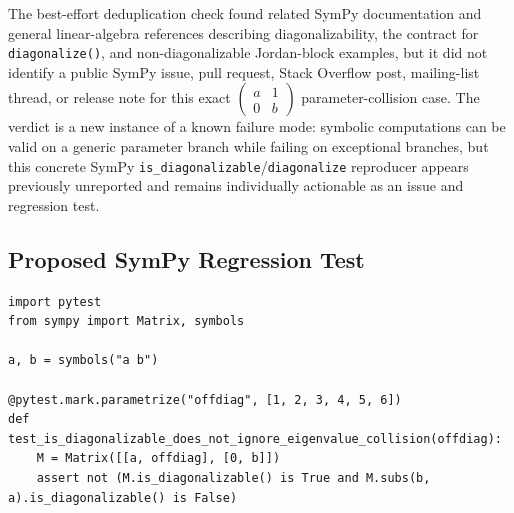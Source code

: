 \documentclass[11pt]{article}
\begin{document}
The best-effort deduplication check found related SymPy documentation and general linear-algebra references describing diagonalizability, the contract for \texttt{diagonalize()}, and non-diagonalizable Jordan-block examples, but it did not identify a public SymPy issue, pull request, Stack Overflow post, mailing-list thread, or release note for this exact \(\begin{pmatrix}a&1\\0&b\end{pmatrix}\) parameter-collision case. The verdict is a new instance of a known failure mode: symbolic computations can be valid on a generic parameter branch while failing on exceptional branches, but this concrete SymPy \texttt{is\_diagonalizable}/\texttt{diagonalize} reproducer appears previously unreported and remains individually actionable as an issue and regression test.

\subsection{Proposed SymPy Regression Test}

\medskip

\begin{lstlisting}[style=bugpython]
import pytest
from sympy import Matrix, symbols

a, b = symbols("a b")

@pytest.mark.parametrize("offdiag", [1, 2, 3, 4, 5, 6])
def test_is_diagonalizable_does_not_ignore_eigenvalue_collision(offdiag):
    M = Matrix([[a, offdiag], [0, b]])
    assert not (M.is_diagonalizable() is True and M.subs(b, a).is_diagonalizable() is False)
\end{lstlisting}
\end{document}
